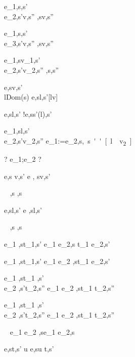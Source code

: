     {e_1,s\evaluate \True,s'\\
     e_2,s'\evaluate v,s''}
    {,s\evaluate v,s''}

  {e_1,s\evaluate \False,s'\\
   e_3,s'\evaluate v,s''}
  {,s\evaluate v,s''}


  {e_1,s\evaluate v_1,s'\\
   e_2,s'\evaluate v_2,s''}
  {,s\evaluate{},s''}


  {e,s\evaluate v,s'\\
   l\not\in Dom(s)}
  {\Ref e,s\evaluate l,s'[l\mapsto v]}

  {e,s\evaluate l,s'}
  {!e,s\evaluate s'(l),s'}

  {e_1,s\evaluate l,s'\\
   e_2,s'\evaluate v_2,s''}
  {e_1:=e_2,s\evaluate \unit,s''[l\mapsto v_2]}


  {?}
  {e_1;e_2 \evaluate ?}

  {e,s \evaluate v,s'}
  {\Edit e , s\evaluate \Edit v,s'}

  {\ }
  {\Enter \tau,s \evaluate \Enter \tau,s}

  {e,s\evaluate l,s'}
  {\Update e ,s\evaluate \Update l,s'}


  {\ }
  {\Fail,s \evaluate \Fail,s}


  {e_1 ,s\evaluate t_1,s'}
  {e_1 \Then e_2,s \evaluate t_1 \Then e_2,s'}

  {e_1 ,s\evaluate t_1,s'}
  {e_1 \Next e_2 ,s\evaluate t_1 \Next e_2,s'}


  {e_1 ,s\evaluate t_1 ,s'\\
   e_2 ,s'\evaluate t_2,s''}
  {e_1 \And e_2 ,s\evaluate t_1 \And t_2,s''}


  {e_1 ,s\evaluate t_1 ,s'\\
   e_2 ,s'\evaluate t_2,s''}
  {e_1 \Or e_2 ,s\evaluate t_1 \Or t_2,s''}

  {\ }
  {e_1 \Xor e_2 ,s\evaluate e_1 \Xor e_2,s}


    {e,s\evaluate t,s'}
    {u \At e,s\evaluate u \At t,s'}





